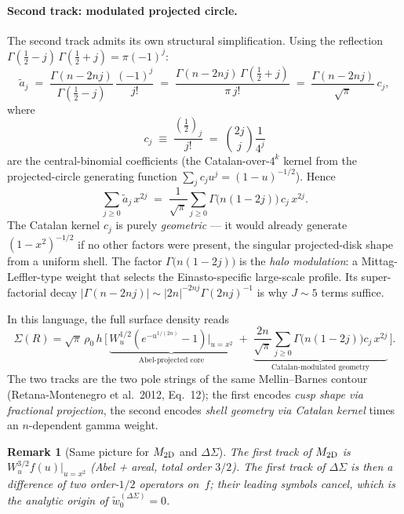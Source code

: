 \documentclass{article}
\newtheorem{remark}{Remark}
\begin{document}
\paragraph{Second track: modulated projected circle.}
The second track admits its own structural simplification.  Using the
reflection $\Gamma(\tfrac12-j)\,\Gamma(\tfrac12+j)=\pi(-1)^j$:
\begin{equation}\label{eq:atilde-catalan}
\tilde a_j
\;=\;\frac{\Gamma(n-2nj)}{\Gamma(\tfrac12-j)}\,\frac{(-1)^j}{j!}
\;=\;\frac{\Gamma(n-2nj)\,\Gamma(\tfrac12+j)}{\pi\,j!}
\;=\;\frac{\Gamma(n-2nj)}{\sqrt\pi}\,c_j,
\end{equation}
where
\begin{equation}\label{eq:catalan}
c_j\;\equiv\;\frac{(\tfrac12)_j}{j!}\;=\;\binom{2j}{j}\frac{1}{4^j}
\end{equation}
are the central-binomial coefficients (the Catalan-over-$4^k$ kernel from
the projected-circle generating function $\sum_j c_j u^j=(1-u)^{-1/2}$).
Hence
\begin{equation}\label{eq:second-track}
\boxed{\;
\sum_{j\ge0}\tilde a_j\,x^{2j}
\;=\;\frac{1}{\sqrt\pi}\sum_{j\ge0}\Gamma\bigl(n(1-2j)\bigr)\,c_j\,x^{2j}.
\;}
\end{equation}
The Catalan kernel $c_j$ is purely \emph{geometric} --- it would already
generate $(1-x^2)^{-1/2}$ if no other factors were present, the singular
projected-disk shape from a uniform shell.  The factor
$\Gamma\bigl(n(1-2j)\bigr)$ is the \emph{halo modulation}: a Mittag-Leffler-type
weight that selects the Einasto-specific large-scale profile.  Its
super-factorial decay $|\Gamma(n-2nj)|\sim|2n|^{-2nj}\Gamma(2nj)^{-1}$ is
why $J\sim5$ terms suffice.

In this language, the full surface density reads
\begin{equation}\label{eq:Sigma-final}
\Sigma(R)=\sqrt\pi\,\rho_0\,h\,\bigg[\,
\underbrace{W^{1/2}_u\!\left(e^{-u^{1/(2n)}}-1\right)\Big|_{u=x^2}}_{\text{Abel-projected core}}
\;+\;\underbrace{\frac{2n}{\sqrt\pi}\sum_{j\ge0}\Gamma\!\bigl(n(1-2j)\bigr)c_j\,x^{2j}}_{\text{Catalan-modulated geometry}}
\,\bigg].
\end{equation}
The two tracks are the two pole strings of the same Mellin--Barnes contour
(Retana-Montenegro et al.\ 2012, Eq.~12); the first encodes \emph{cusp shape
via fractional projection}, the second encodes \emph{shell geometry via
Catalan kernel} times an $n$-dependent gamma weight.

\begin{remark}[Same picture for $M_{\rm 2D}$ and $\Delta\Sigma$]
The first track of $M_{\rm 2D}$ is $W^{3/2}_u f(u)|_{u=x^2}$ (Abel +
areal, total order $3/2$). The first track of $\Delta\Sigma$ is then a
difference of two order-$1/2$ operators on~$f$; their leading symbols
cancel, which is the analytic origin of
$\tilde w_0^{(\Delta\Sigma)}=0$.
\end{remark}
\end{document}

